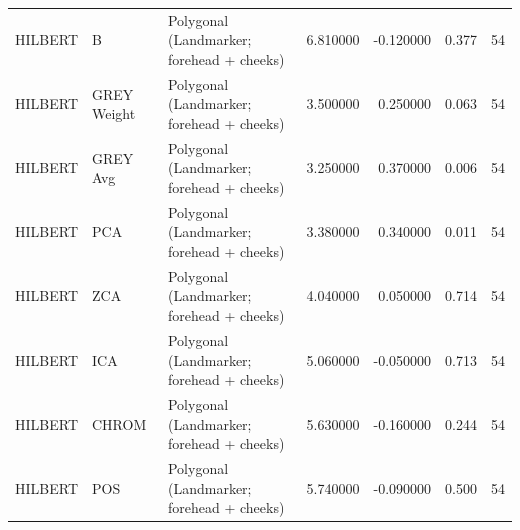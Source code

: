 \begin{table}[htbp]
\begin{tabular}{l l l r r l r}
HILBERT & B & Polygonal (Landmarker; forehead + cheeks) & 6.810000 & -0.120000 & 0.377 & 54 \\
HILBERT & GREY Weight & Polygonal (Landmarker; forehead + cheeks) & 3.500000 & 0.250000 & 0.063 & 54 \\
HILBERT & GREY Avg & Polygonal (Landmarker; forehead + cheeks) & 3.250000 & 0.370000 & 0.006 & 54 \\
HILBERT & PCA & Polygonal (Landmarker; forehead + cheeks) & 3.380000 & 0.340000 & 0.011 & 54 \\
HILBERT & ZCA & Polygonal (Landmarker; forehead + cheeks) & 4.040000 & 0.050000 & 0.714 & 54 \\
HILBERT & ICA & Polygonal (Landmarker; forehead + cheeks) & 5.060000 & -0.050000 & 0.713 & 54 \\
HILBERT & CHROM & Polygonal (Landmarker; forehead + cheeks) & 5.630000 & -0.160000 & 0.244 & 54 \\
HILBERT & POS & Polygonal (Landmarker; forehead + cheeks) & 5.740000 & -0.090000 & 0.500 & 54 \\
\bottomrule
\end{tabular}

\end{table}
